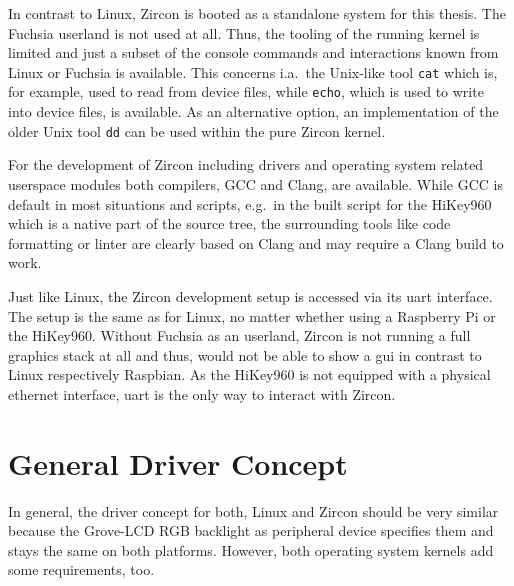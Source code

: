 In contrast to Linux, Zircon is booted as a standalone system for this thesis.
The Fuchsia userland is not used at all.
Thus, the tooling of the running kernel is limited and just a subset of the console commands and interactions known from Linux or Fuchsia is available.
This concerns i.a.\ the Unix-like tool \texttt{cat} which is, for example, used to read from device files, while \texttt{echo}, which is used to write into device files, is available.
As an alternative option, an implementation of the older Unix tool \texttt{dd} can be used within the pure Zircon kernel.

For the development of Zircon including drivers and operating system related\\userspace modules both compilers, GCC and Clang, are available.
While GCC is default in most situations and scripts, e.g.\ in the built script for the HiKey960 which is a native part of the source tree, the surrounding tools like code formatting or linter are clearly based on Clang and may require a Clang build to work.

Just like Linux, the Zircon development setup is accessed via its \ac{uart} interface.
The setup is the same as for Linux, no matter whether using a Raspberry Pi or the HiKey960.
Without Fuchsia as an userland, Zircon is not running a full graphics stack at all and thus, would not be able to show a \ac{gui} in contrast to Linux respectively Raspbian.
As the HiKey960 is not equipped with a physical ethernet interface, \ac{uart} is the only way to interact with Zircon.

  
\section{General Driver Concept}\label{sec:cs-driver-concept}
In general, the driver concept for both, Linux and Zircon should be very similar because the Grove-LCD RGB backlight as peripheral device specifies them and stays the same on both platforms.
However, both operating system kernels add some requirements, too.

